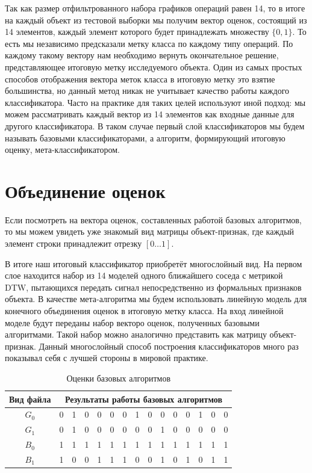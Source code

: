 Так как размер отфильтрованного набора графиков операций равен 14, то в итоге на каждый объект из тестовой выборки мы получим вектор оценок, состоящий из 14 элементов, каждый элемент которого будет принадлежать множеству $\{0, 1\}$. То есть мы независимо предсказали метку класса по каждому типу операций. По каждому такому вектору нам необходимо вернуть окончательное решение, представляющее итоговую метку исследуемого объекта. Один из самых простых способов отображения вектора меток класса в итоговую метку это взятие большинства, но данный метод никак не учитывает качество работы каждого классификатора. Часто на практике для таких целей используют иной подход: мы можем рассматривать каждый вектор из 14 элементов как входные данные для другого классификатора. В таком случае первый слой классификаторов мы будем называть базовыми классификаторами, а алгоритм, формирующий итоговую оценку, мета-классификатором.

\section{Объединение оценок}

Если посмотреть на вектора оценок, составленных работой базовых алгоритмов, то мы можем увидеть уже знакомый вид матрицы объект-признак, где каждый элемент строки принадлежит отрезку $[0 \dots 1]$.

В итоге наш итоговый классификатор приобретёт многослойный вид. На первом слое находится набор из 14 моделей одного ближайшего соседа с метрикой DTW, пытающихся передать сигнал непосредственно из формальных признаков объекта. В качестве мета-алгоритма мы будем использовать линейную модель для конечного объединения оценок в итоговую метку класса. На вход линейной моделе будут переданы набор векторо оценок, полученных базовыми алгоритмами. Такой набор можно аналогично представить как матрицу объект-признак. Данный многослойный способ построения классификаторов много раз показывал себя с лучшей стороны в мировой практике.

\bgroup
\def\arraystretch{1.5}%
\begin{table}[ht]
\caption{Оценки базовых алгоритмов}
\label{tab_weight}
\centering
    \begin{tabular}{|c|c|c|c|c|c|c|c|c|c|c|c|c|c|c|}
    \hline Вид файла & \multicolumn{14}{c|}{Результаты работы базовых алгоритмов} \\
	\hline $G_0$ & 0 & 1 & 0 & 0 & 0 & 0 & 1 & 0 & 0 & 0 & 0 & 1 & 0 & 0 \\
	\hline $G_1$ & 0 & 1 & 0 & 0 & 0 & 0 & 0 & 0 & 1 & 0 & 0 & 0 & 0 & 0 \\
	\hline $B_0$ & 1 & 1 & 1 & 1 & 1 & 1 & 1 & 1 & 1 & 1 & 1 & 1 & 1 & 1 \\
	\hline $B_1$ & 1 & 0 & 0 & 1 & 1 & 1 & 0 & 0 & 1 & 0 & 1 & 0 & 1 & 1 \\

	\hline
    \end{tabular}
\end{table}
\egroup

